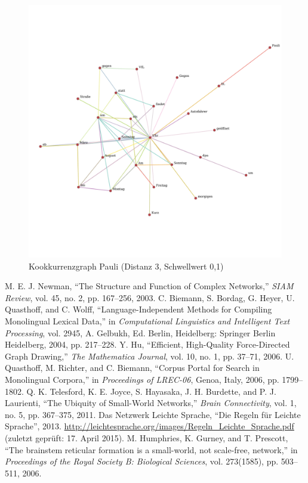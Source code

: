 \documentclass[11pt, a4paper]{article}
\begin{document}
\begin{figure}[hp!]
    \centering
        \includegraphics[scale=.4]{../../data/results/longpath_wordgraphs/den/graph_Pauli.pdf}
    \caption{Kookkurrenzgraph Pauli (Distanz 3, Schwellwert 0,1)}
\end{figure}

\newpage
\begin{thebibliography}{9}
     M. E. J. Newman, “The Structure and Function of Complex Networks,” \emph{SIAM Review}, vol. 45, no. 2, pp. 167–256, 2003.
     C. Biemann, S. Bordag, G. Heyer, U. Quasthoff, and C. Wolff, “Language-Independent Methods for Compiling Monolingual Lexical Data,” in \emph{Computational Linguistics and Intelligent Text Processing}, vol. 2945, A. Gelbukh, Ed. Berlin, Heidelberg: Springer Berlin Heidelberg, 2004, pp. 217–228.
     Y. Hu, “Efficient, High-Quality Force-Directed Graph Drawing,” \emph{The Mathematica Journal}, vol. 10, no. 1, pp. 37–71, 2006.
    U. Quasthoff, M. Richter, and C. Biemann, “Corpus Portal for Search in Monolingual Corpora,” in \emph{Proceedings of LREC-06}, Genoa, Italy, 2006, pp. 1799–1802.
    Q. K. Telesford, K. E. Joyce, S. Hayasaka, J. H. Burdette, and P. J. Laurienti, “The Ubiquity of Small-World Networks,” \emph{Brain Connectivity}, vol. 1, no. 5, pp. 367–375, 2011.
     Das Netzwerk Leichte Sprache, “Die Regeln für Leichte Sprache”, 2013. \url{http://leichtesprache.org/images/Regeln_Leichte_Sprache.pdf} (zuletzt geprüft: 17. April 2015).
    M. Humphries, K. Gurney, and T. Prescott, “The brainstem reticular formation is a small-world, not scale-free, network,” in \emph{Proceedings of the Royal Society B: Biological Sciences}, vol. 273(1585), pp. 503–511, 2006.
\end{thebibliography}

\listoftables

\listoffigures
\end{document}

